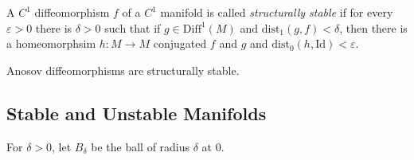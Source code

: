 A $C^1$ diffeomorphism $f$ of a $C^1$ manifold is called \textit{structurally stable} if for every $\varepsilon > 0$ there is $\delta > 0$ such that if $g \in \mathrm{Diff}^1(M)$ and $\mathrm{dist}_1(g,f) < \delta$, then there is a homeomorphsim $h: M \to M$ conjugated $f$ and $g$ and $\mathrm{dist}_0(h, \mathrm{Id}) < \varepsilon$. \\

\begin{cor}
Anosov diffeomorphisms are structurally stable.
\end{cor}


\subsection{Stable and Unstable Manifolds}

For $\delta > 0$, let $B_{\delta}$ be the ball of radius $\delta$ at $0$.

